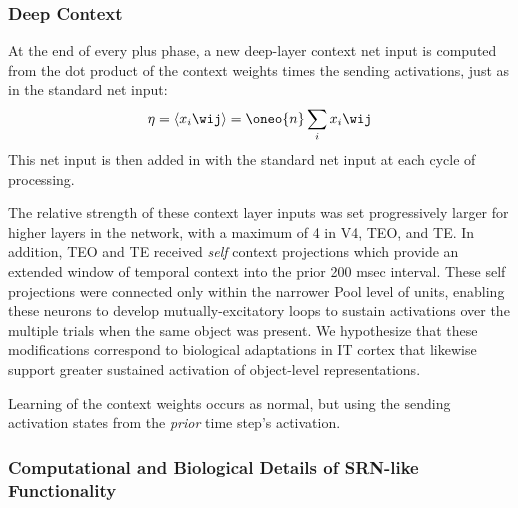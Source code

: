 \documentclass[12pt,twoside]{article}
\newif\myifpdf
\begin{document}
\subsubsection{Deep Context}

At the end of every plus phase, a new deep-layer context net input is computed from the dot product of the context weights times the sending activations, just as in the standard net input:
\begin{equation}
 \eta = \langle x_i \wij \rangle = \oneo{n} \sum_i x_i \wij
 \label{eq.net_in_ti}
\end{equation}
This net input is then added in with the standard net input at each cycle of processing.


The relative strength of these context layer inputs was set progressively larger for higher layers in the network, with a maximum of 4 in V4, TEO, and TE.  In addition, TEO and TE received {\em self} context projections which provide an extended window of temporal context into the prior 200 msec interval.  These self projections were connected only within the narrower Pool level of units, enabling these neurons to develop mutually-excitatory loops to sustain activations over the multiple trials when the same object was present.  We hypothesize that these modifications correspond to biological adaptations in IT cortex that likewise support greater sustained activation of object-level representations.

Learning of the context weights occurs as normal, but using the sending activation states from the {\em prior} time step's activation.

\subsubsection{Computational and Biological Details of SRN-like Functionality}
\end{document}
